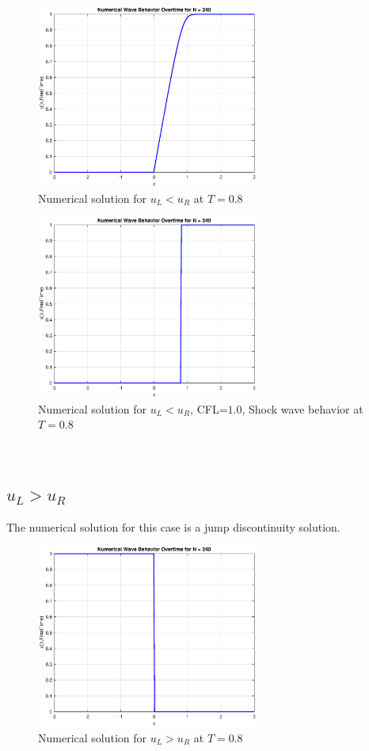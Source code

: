 \documentclass[12pt]{article} %
\begin{document}
\begin{figure}[h]
\caption{Numerical solution for $u_L<u_R$ at $T=0.8$}
\centering
\includegraphics[width=0.65\textwidth]{p1b_1.eps}
\end{figure}


\begin{figure}[h]
\caption{Numerical solution for $u_L<u_R$, CFL=$1.0$, Shock wave behavior at $T=0.8$}
\centering
\includegraphics[width=0.65\textwidth]{right_shock.eps}
\end{figure}
\
\newpage
\
\
\newpage
\
\newpage
\subsection{$u_L > u_R$}
The numerical solution for this case is a jump discontinuity solution.

\begin{figure}[h]
\caption{Numerical solution for $u_L>u_R$ at $T=0.8$}
\centering
\includegraphics[width=0.65\textwidth]{p1b_2.eps}
\end{figure}
\end{document}
